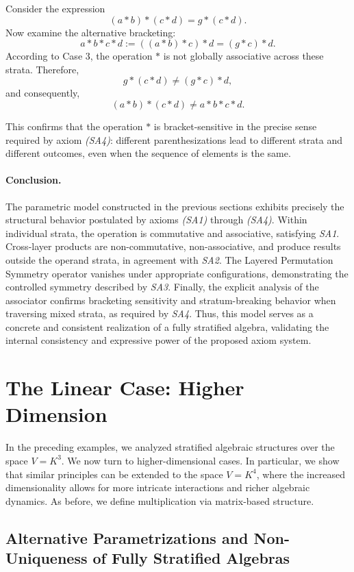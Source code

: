 \documentclass[12pt]{article}
\theoremstyle{definition}
\theoremstyle{plain}
\theoremstyle{remark}
\begin{document}
Consider the expression
\[
(a * b) * (c * d) = g * (c * d).
\]
Now examine the alternative bracketing:
\[
a * b * c * d := ((a * b) * c) * d = (g * c) * d.
\]
According to Case 3, the operation \( * \) is not globally associative across these strata. Therefore,
\[
g * (c * d) \ne (g * c) * d,
\]
and consequently,
\[
(a * b) * (c * d) \ne a * b * c * d.
\]

This confirms that the operation \( * \) is bracket-sensitive in the precise sense required by axiom \emph{(SA4)}: different parenthesizations lead to different strata and different outcomes, even when the sequence of elements is the same.

\paragraph{Conclusion.}
The parametric model constructed in the previous sections exhibits precisely the structural behavior postulated by axioms \emph{(SA1)} through \emph{(SA4)}. Within individual strata, the operation is commutative and associative, satisfying \emph{SA1}. Cross-layer products are non-commutative, non-associative, and produce results outside the operand strata, in agreement with \emph{SA2}. The Layered Permutation Symmetry operator vanishes under appropriate configurations, demonstrating the controlled symmetry described by \emph{SA3}. Finally, the explicit analysis of the associator confirms bracketing sensitivity and stratum-breaking behavior when traversing mixed strata, as required by \emph{SA4}. Thus, this model serves as a concrete and consistent realization of a fully stratified algebra, validating the internal consistency and expressive power of the proposed axiom system.

\section{The Linear Case: Higher Dimension}

In the preceding examples, we analyzed stratified algebraic structures over the space \( V = K^3 \). We now turn to higher-dimensional cases. In particular, we show that similar principles can be extended to the space \( V = K^4 \), where the increased dimensionality allows for more intricate interactions and richer algebraic dynamics. As before, we define multiplication via matrix-based structure.

\subsection{Alternative Parametrizations and Non-Uniqueness of Fully Stratified Algebras}
\end{document}
